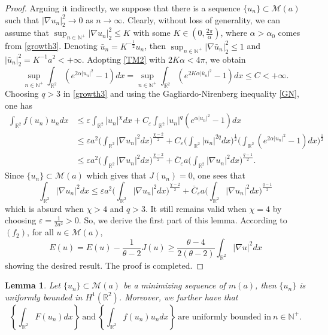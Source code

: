 \documentclass[11pt]{amsart}
\numberwithin{equation}{section}
\newtheorem{lemma}[theorem]{Lemma}
\theoremstyle{definition}
\newcommand{\R}{\mathbb{R}}
\begin{document}
\begin{proof}
Arguing it indirectly, we suppose that there is a sequence $\{u_n\}\subset \mathcal{M}(a)$ such that
$|\nabla u_n|_2^2\to0$ as $n\to\infty$. Clearly, without loss of generality, we can assume that
$\sup_{n\in \mathbb{N}^+}|\nabla u_n|_2^2\leq K$ with some $K\in(0,\frac{2\pi}{\alpha})$,
where $\alpha>\alpha_0$ comes from \eqref{growth3}. Denoting $\bar{u}_n=K^{-\frac12}u_n$,
then $\sup_{n\in \mathbb{N}^+}|\nabla \bar{u}_n|_2^2\leq1$ and
$|\bar{u}_n|^{2}_2=K^{-1}a^2<+\infty$. Adopting \eqref{TM2} with $2K\alpha<4\pi$, we obtain
\[
\sup_{n\in \mathbb{N}^+}\int_{\R^2}(e^{2\alpha|u_n|^2}-1) dx=
\sup_{n\in \mathbb{N}^+}\int_{\R^2}(e^{2K\alpha|\bar{u}_n|^2}-1) dx\leq C<+\infty.
\]
Choosing $q>3$ in \eqref{growth3} and using the Gagliardo-Nirenberg inequality \eqref{GN}, one has
\begin{align}\label{positive1}
\nonumber \int_{\R^2}f(u_n)u_ndx &\leq \varepsilon\int_{\R^2}|u_n|^\chi dx+C_\varepsilon\int_{\R^2}|u_n|^q(e^{\alpha|u_n|^2}-1) dx \\
\nonumber   & \leq  \varepsilon a^2\bigg(\int_{\R^2}|\nabla u_n|^2 dx\bigg)^{\frac{\chi-2}{2}}+
  C_\varepsilon\bigg(\int_{\R^2}|u_n|^{2q}dx\bigg)^{\frac12}\bigg( \int_{\R^2}(e^{2\alpha|u_n|^2}-1) dx\bigg)^{\frac12}\\
  & \leq  \varepsilon a^2\bigg(\int_{\R^2}|\nabla u_n|^2 dx\bigg)^{\frac{\chi-2}{2}}+
  \bar{C}_\varepsilon a\bigg(\int_{\R^2}|\nabla u_n|^{2}dx\bigg)^{\frac{q-1}2}.
\end{align}
Since $\{u_n\}\subset \mathcal{M}(a)$ which gives that $J(u_n)=0$, one sees that
\[
\int_{\R^2}|\nabla u_n|^2 dx\leq  \varepsilon a^2\bigg(\int_{\R^2}|\nabla u_n|^2 dx\bigg)^{\frac{\chi-2}{2}}+
  \bar{C}_\varepsilon a\bigg(\int_{\R^2}|\nabla u_n|^{2}dx\bigg)^{\frac{q-1}2}
\]
which is absurd when $\chi>4$ and $q>3$. It still remains valid when $\chi=4$
by choosing $\varepsilon=\frac1{2a^2}>0$. So, we derive the first part of this lemma.
According to $(f_2)$, for all $u\in \mathcal{M}(a)$,
\[
E(u)=E(u)-\frac1{\theta-2}J(u)\geq\frac{\theta-4}{2(\theta-2)}\int_{\R^2}|\nabla u|^2 dx
\]
showing the desired result. The proof is completed.
\end{proof}




\begin{lemma}\label{bounded}
Let $\{u_n\}\subset \mathcal{M}(a)$ be a minimizing sequence of $m(a)$, then $\{u_n\}$ is uniformly
 bounded in $H^1(\R^2)$. Moreover, we further
have that
\begin{equation}\label{bounded1}
\left\{\int_{\R^2}F(u_n)dx\right\}~\text{and}~\left\{\int_{\R^2}f(u_n)u_ndx\right\}~\text{are uniformly bounded in}~n\in \mathbb{N}^+.
\end{equation}
\end{lemma}
\end{document}
